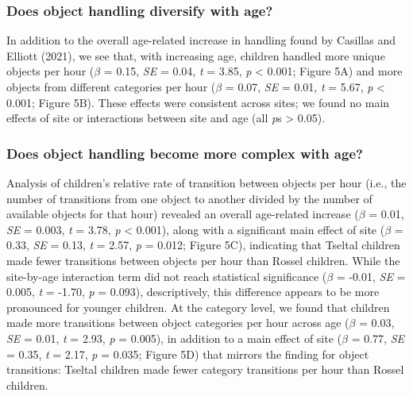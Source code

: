 \documentclass[10pt, letterpaper]{article}
\begin{document}
\vspace{\baselineskip}

\hypertarget{does-object-handling-diversify-with-age}{%
\subsubsection{Does object handling diversify with
age?}\label{does-object-handling-diversify-with-age}}

In addition to the overall age-related increase in handling found by
Casillas and Elliott (2021), we see that, with increasing age, children
handled more unique objects per hour (\(\beta\) = 0.15, \emph{SE} =
0.04, \emph{t} = 3.85, \emph{p} \textless{} 0.001; Figure 5A) and more
objects from different categories per hour (\(\beta\) = 0.07, \emph{SE}
= 0.01, \emph{t} = 5.67, \emph{p} \textless{} 0.001; Figure 5B). These
effects were consistent across sites; we found no main effects of site
or interactions between site and age (all \emph{p}s \textgreater{}
0.05).\newline

\hypertarget{does-object-handling-become-more-complex-with-age}{%
\subsubsection{Does object handling become more complex with
age?}\label{does-object-handling-become-more-complex-with-age}}

Analysis of children's relative rate of transition between objects per
hour (i.e., the number of transitions from one object to another divided
by the number of available objects for that hour) revealed an overall
age-related increase (\(\beta\) = 0.01, \emph{SE} = 0.003, \emph{t} =
3.78, \emph{p} \textless{} 0.001), along with a significant main effect
of site (\(\beta\) = 0.33, \emph{SE} = 0.13, \emph{t} = 2.57, \emph{p} =
0.012; Figure 5C), indicating that Tseltal children made fewer
transitions between objects per hour than Rossel children. While the
site-by-age interaction term did not reach statistical significance
(\(\beta\) = -0.01, \emph{SE} = 0.005, \emph{t} = -1.70, \emph{p} =
0.093), descriptively, this difference appears to be more pronounced for
younger children. At the category level, we found that children made
more transitions between object categories per hour across age
(\(\beta\) = 0.03, \emph{SE} = 0.01, \emph{t} = 2.93, \emph{p} = 0.005),
in addition to a main effect of site (\(\beta\) = 0.77, \emph{SE} =
0.35, \emph{t} = 2.17, \emph{p} = 0.035; Figure 5D) that mirrors the
finding for object transitions: Tseltal children made fewer category
transitions per hour than Rossel children.
\end{document}
